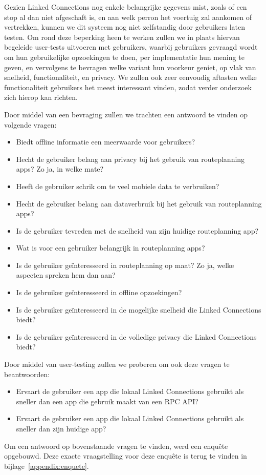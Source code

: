 Gezien Linked Connections nog enkele belangrijke gegevens mist, zoals of een stop al dan niet afgeschaft is, en aan welk perron het voertuig zal aankomen of vertrekken, kunnen we dit systeem nog niet zelfstandig door gebruikers laten testen. Om rond deze beperking heen te werken zullen we in plaats hiervan begeleide user-tests uitvoeren met gebruikers, waarbij gebruikers gevraagd wordt om hun gebruikelijke opzoekingen te doen, per implementatie hun mening te geven, en vervolgens te bevragen welke variant hun voorkeur geniet, op vlak van snelheid, functionaliteit, en privacy.
We zullen ook zeer eenvoudig aftasten welke functionaliteit gebruikers het meest interessant vinden, zodat verder onderzoek zich hierop kan richten.

Door middel van een bevraging zullen we trachten een antwoord te vinden op volgende vragen:
\begin{itemize}
	\item Biedt offline informatie een meerwaarde voor gebruikers?
	\item Hecht de gebruiker belang aan privacy bij het gebruik van routeplanning apps? Zo ja, in welke mate?
	\item Heeft de gebruiker schrik om te veel mobiele data te verbruiken?
	\item Hecht de gebruiker belang aan dataverbruik bij het gebruik van routeplanning apps?
	\item Is de gebruiker tevreden met de snelheid van zijn huidige routeplanning app?
	\item Wat is voor een gebruiker belangrijk in routeplanning apps?
	\item Is de gebruiker geïnteresseerd in routeplanning op maat? Zo ja, welke aspecten spreken hem dan aan?
	\item Is de gebruiker geïnteresseerd in offline opzoekingen?
	\item Is de gebruiker geïnteresseerd in de mogelijke snelheid die Linked Connections biedt?
	\item Is de gebruiker geïnteresseerd in de volledige privacy die Linked Connections biedt?
\end{itemize}

Door middel van user-testing zullen we proberen om ook deze vragen te beantwoorden:
\begin{itemize}
	\item Ervaart de gebruiker een app die lokaal Linked Connections gebruikt als sneller dan een app die gebruik maakt van een RPC API?
	\item Ervaart de gebruiker een app die lokaal Linked Connections gebruikt als sneller dan zijn huidige app?
\end{itemize}

Om een antwoord op bovenstaande vragen te vinden, werd een enquête opgebouwd. Deze exacte vraagstelling voor deze enquête is terug te vinden in bijlage~\ref{appendix:enquete}.